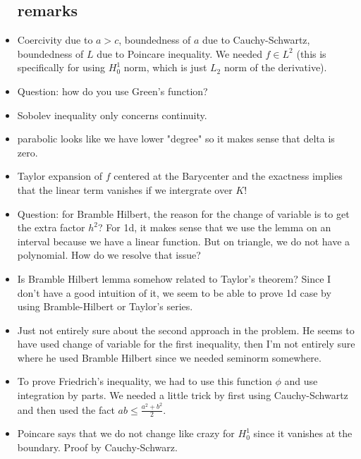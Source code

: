 \documentclass{article}
\theoremstyle{remark}
\begin{document}
\begin{itemize}
\subsection*{remarks}
\item Coercivity due to $a>c$, boundedness of $a$ due to Cauchy-Schwartz, boundedness of $L$ due to Poincare inequality. We needed $f\in L^2$ (this is specifically for using $H_0^1$ norm, which is just $L_2$ norm of the derivative).
\item Question: how do you use Green's function?
\item Sobolev inequality only concerns continuity.
\item parabolic looks like we have lower "degree" so it makes sense that delta is zero.
\item Taylor expansion of $f$ centered at the Barycenter and the exactness implies that the linear term vanishes if we intergrate over $K$!
\item Question: for Bramble Hilbert, the reason for the change of variable is to get the extra factor $h^2$? For 1d, it makes sense that we use the lemma on an interval because we have a linear function. But on triangle, we do not have a polynomial. How do we resolve that issue?
\item Is Bramble Hilbert lemma somehow related to Taylor's theorem? Since I don't have a good intuition of it, we seem to be able to prove 1d case by using Bramble-Hilbert or Taylor's series.
\item Just not entirely sure about the second approach in the problem. He seems to have used change of variable for the first inequality, then I'm not entirely sure where he used Bramble Hilbert since we needed seminorm somewhere.
\item To prove Friedrich's inequality, we had to use this function $\phi$ and use integration by parts. We needed a little trick by first using Cauchy-Schwartz and then used the fact $ab\leq\frac{a^2+b^2}{2}$.
\item Poincare says that we do not change like crazy for $H^1_0$ since it vanishes at the boundary. Proof by Cauchy-Schwarz.

\end{itemize}
\end{document}

